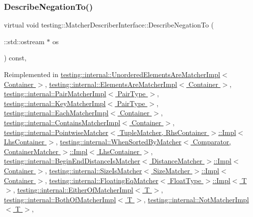 \subsubsection{\texorpdfstring{Describe\+Negation\+To()}{DescribeNegationTo()}}
{\footnotesize\ttfamily virtual void testing\+::\+Matcher\+Describer\+Interface\+::\+Describe\+Negation\+To (\begin{DoxyParamCaption}\item[{\+::std\+::ostream $\ast$}]{os }\end{DoxyParamCaption}) const\hspace{0.3cm}{\ttfamily [inline]}, {\ttfamily [virtual]}}



Reimplemented in \hyperlink{classtesting_1_1internal_1_1_unordered_elements_are_matcher_impl_af2185915595c02d6132ba5f3f9ccb6cd}{testing\+::internal\+::\+Unordered\+Elements\+Are\+Matcher\+Impl$<$ Container $>$}, \hyperlink{classtesting_1_1internal_1_1_elements_are_matcher_impl_ab8485a836eb7ffabc43b05187e58616d}{testing\+::internal\+::\+Elements\+Are\+Matcher\+Impl$<$ Container $>$}, \hyperlink{classtesting_1_1internal_1_1_pair_matcher_impl_a41ef8b1ae031cf342a380e2f2fb2a526}{testing\+::internal\+::\+Pair\+Matcher\+Impl$<$ Pair\+Type $>$}, \hyperlink{classtesting_1_1internal_1_1_key_matcher_impl_a4be87d136547063a16777151b691046d}{testing\+::internal\+::\+Key\+Matcher\+Impl$<$ Pair\+Type $>$}, \hyperlink{classtesting_1_1internal_1_1_each_matcher_impl_a5be5bbd61f7a350fcbe30deea4c2a0c6}{testing\+::internal\+::\+Each\+Matcher\+Impl$<$ Container $>$}, \hyperlink{classtesting_1_1internal_1_1_contains_matcher_impl_a9d7867110ba3f346399f23e41cc75c5b}{testing\+::internal\+::\+Contains\+Matcher\+Impl$<$ Container $>$}, \hyperlink{classtesting_1_1internal_1_1_pointwise_matcher_1_1_impl_a26d3a829149e4c497aaced42aad7b247}{testing\+::internal\+::\+Pointwise\+Matcher$<$ Tuple\+Matcher, Rhs\+Container $>$\+::\+Impl$<$ Lhs\+Container $>$}, \hyperlink{classtesting_1_1internal_1_1_when_sorted_by_matcher_1_1_impl_a0a59f77fdbb88a6326e5aba671f2aa3e}{testing\+::internal\+::\+When\+Sorted\+By\+Matcher$<$ Comparator, Container\+Matcher $>$\+::\+Impl$<$ Lhs\+Container $>$}, \hyperlink{classtesting_1_1internal_1_1_begin_end_distance_is_matcher_1_1_impl_a359711f21b6f116a5233fca78736fa47}{testing\+::internal\+::\+Begin\+End\+Distance\+Is\+Matcher$<$ Distance\+Matcher $>$\+::\+Impl$<$ Container $>$}, \hyperlink{classtesting_1_1internal_1_1_size_is_matcher_1_1_impl_a24b76fc2ac7b8d58cb5c7a3c5d5d35ab}{testing\+::internal\+::\+Size\+Is\+Matcher$<$ Size\+Matcher $>$\+::\+Impl$<$ Container $>$}, \hyperlink{classtesting_1_1internal_1_1_floating_eq_matcher_1_1_impl_a3eff238a812f4a105df1222a28f6cdbf}{testing\+::internal\+::\+Floating\+Eq\+Matcher$<$ Float\+Type $>$\+::\+Impl$<$ T $>$}, \hyperlink{classtesting_1_1internal_1_1_either_of_matcher_impl_ab5a4eac981acde377a4fd344507b1d71}{testing\+::internal\+::\+Either\+Of\+Matcher\+Impl$<$ T $>$}, \hyperlink{classtesting_1_1internal_1_1_both_of_matcher_impl_a4f6017c7aca6e5c8166ff4c613d8dbec}{testing\+::internal\+::\+Both\+Of\+Matcher\+Impl$<$ T $>$}, \hyperlink{classtesting_1_1internal_1_1_not_matcher_impl_a960f799e25ba7264d0d45fa61bb9271c}{testing\+::internal\+::\+Not\+Matcher\+Impl$<$ T $>$}, 